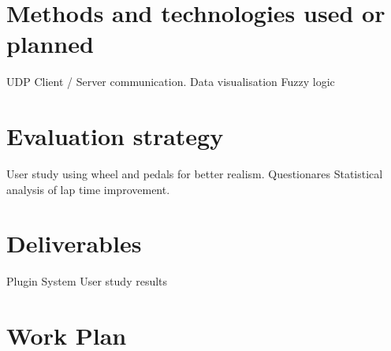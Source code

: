 \documentclass{article}
\begin{document}
\section{Methods and technologies used or planned}

UDP Client / Server communication.
Data visualisation
Fuzzy logic

\section{Evaluation strategy}

User study using wheel and pedals for better realism. 
Questionares
Statistical analysis of lap time improvement.

\section{Deliverables}

Plugin System
User study results

\section{Work Plan}


\newpage
{}

\end{document}
